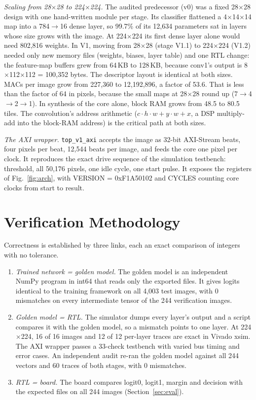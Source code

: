 \documentclass[conference]{IEEEtran}
\newcommand{\code}[1]{\texttt{#1}}
\begin{document}
\textit{Scaling from 28$\times$28 to 224$\times$224.} The audited predecessor (v0) was a fixed
28$\times$28 design with one hand-written module per stage. Its classifier flattened a
4$\times$14$\times$14 map into a 784$\to$16 dense layer, so 99.7\% of its 12,634 parameters sat
in layers whose size grows with the image. At 224$\times$224 its first dense layer alone would
need 802,816 weights. In V1, moving from 28$\times$28 (stage V1.1) to 224$\times$224 (V1.2)
needed only new memory files (weights, biases, layer table) and one RTL change: the feature-map
buffers grew from 64\,KB to 128\,KB, because conv1's output is 8$\times$112$\times$112 = 100,352
bytes. The descriptor layout is identical at both sizes. MACs per image grow from 227,360 to
12,192,896, a factor of 53.6. That is less than the factor of 64 in pixels, because the small
maps at 28$\times$28 round up (7$\to$4$\to$2$\to$1). In synthesis of the core alone, block RAM
grows from 48.5 to 80.5 tiles. The convolution's address arithmetic ($c\cdot h\cdot w + y\cdot w
+ x$, a DSP multiply-add into the block-RAM address) is the critical path at both sizes.

\textit{The AXI wrapper.} \code{top\_v1\_axi} accepts the image as 32-bit AXI-Stream beats,
four pixels per beat, 12,544 beats per image, and feeds the core one pixel per clock. It
reproduces the exact drive sequence of the simulation testbench: threshold, all 50,176 pixels,
one idle cycle, one start pulse. It exposes the registers of Fig.~\ref{fig:arch}, with VERSION =
0xF1A50102 and CYCLES counting core clocks from start to result.

\section{Verification Methodology}\label{sec:verif}

Correctness is established by three links, each an exact comparison of integers with no
tolerance.
\begin{enumerate}
\item \textit{Trained network = golden model.} The golden model is an independent NumPy program
in int64 that reads only the exported files. It gives logits identical to the training framework
on all 4,003 test images, with 0 mismatches on every intermediate tensor of the 244 verification
images.
\item \textit{Golden model = RTL.} The simulator dumps every layer's output and a script compares
it with the golden model, so a mismatch points to one layer. At 224$\times$224, 16 of 16 images
and 12 of 12 per-layer traces are exact in Vivado xsim. The AXI wrapper passes a 33-check
testbench with varied bus timing and error cases. An independent audit re-ran the golden model
against all 244 vectors and 60 traces of both stages, with 0 mismatches.
\item \textit{RTL = board.} The board compares logit0, logit1, margin and decision with the
expected files on all 244 images (Section~\ref{sec:eval}).
\end{enumerate}
\end{document}
